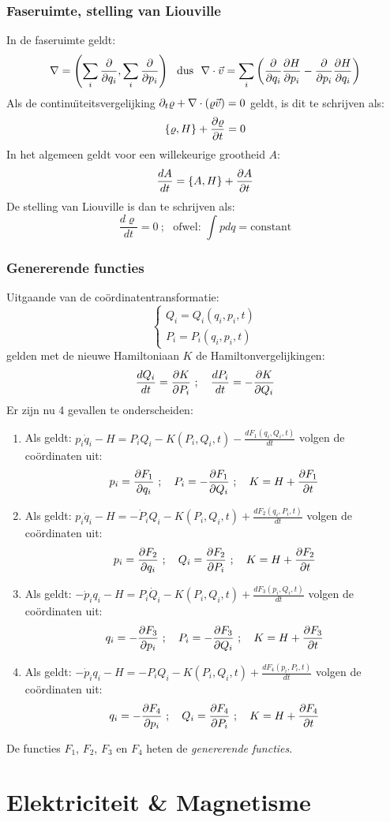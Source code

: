 \documentclass[twoside]{report}
\begin{document}
\subsection{Faseruimte, stelling van Liouville}
In de faseruimte geldt:
\[
\nabla=\left(\sum_i\frac{\partial }{\partial q_i},\sum_i\frac{\partial }{\partial p_i}\right)\mbox{~~dus~~}
\nabla\cdot\vec{v}=\sum_i\left(\frac{\partial }{\partial q_i}\frac{\partial H}{\partial p_i}-\frac{\partial }{\partial p_i}\frac{\partial H}{\partial q_i}\right)
\]
Als de continu\"{\i}teitsvergelijking $\partial_t\varrho+\nabla\cdot(\varrho\vec{v})=0$ geldt,
is dit te schrijven als:
\[
\{\varrho,H\}+\frac{\partial \varrho}{\partial t}=0
\]
In het algemeen geldt voor een willekeurige grootheid $A$:
\[
\frac{dA}{dt}=\{A,H\}+\frac{\partial A}{\partial t}
\]
De stelling van Liouville is dan te schrijven als:
\[
\frac{d\varrho}{dt}=0~;~~~\mbox{ofwel:~}\int pdq=\mbox{constant}
\]
\subsection{Genererende functies}
Uitgaande van de co\"ordinatentransformatie:
\[
\left\{\begin{array}{l}
Q_i=Q_i(q_i,p_i,t)\\
P_i=P_i(q_i,p_i,t)
\end{array}\right.
\]
gelden met de nieuwe Hamiltoniaan $K$ de Hamiltonvergelijkingen:
\[
\frac{dQ_i}{dt}=\frac{\partial K}{\partial P_i}~;~~~\frac{dP_i}{dt}=-\frac{\partial K}{\partial Q_i}
\]
Er zijn nu 4 gevallen te onderscheiden:
\begin{enumerate}
\item Als geldt: $\displaystyle p_i\dot{q}_i-H=P_iQ_i-K(P_i,Q_i,t)-\frac{dF_1(q_i,Q_i,t)}{dt}$
volgen de co\"ordinaten uit:
\[
p_i=\frac{\partial F_1}{\partial q_i}~;~~~P_i=-\frac{\partial F_1}{\partial Q_i}~;~~~K=H+\frac{\partial F_1}{\partial t}
\]
\item Als geldt: $\displaystyle p_i\dot{q}_i-H=-\dot{P}_iQ_i-K(P_i,Q_i,t)+\frac{dF_2(q_i,P_i,t)}{dt}$
volgen de co\"ordinaten uit:
\[
p_i=\frac{\partial F_2}{\partial q_i}~;~~~Q_i=\frac{\partial F_2}{\partial P_i}~;~~~K=H+\frac{\partial F_2}{\partial t}
\]
\item Als geldt: $\displaystyle-\dot{p}_iq_i-H=P_i\dot{Q}_i-K(P_i,Q_i,t)+\frac{dF_3(p_i,Q_i,t)}{dt}$
volgen de co\"ordinaten uit:
\[
q_i=-\frac{\partial F_3}{\partial p_i}~;~~~P_i=-\frac{\partial F_3}{\partial Q_i}~;~~~K=H+\frac{\partial F_3}{\partial t}
\]
\item Als geldt: $\displaystyle-\dot{p}_iq_i-H=-P_iQ_i-K(P_i,Q_i,t)+\frac{dF_4(p_i,P_i,t)}{dt}$
volgen de co\"ordinaten uit:
\[
q_i=-\frac{\partial F_4}{\partial p_i}~;~~~Q_i=\frac{\partial F_4}{\partial P_i}~;~~~K=H+\frac{\partial F_4}{\partial t}
\]
\end{enumerate}
De functies $F_1$, $F_2$, $F_3$ en $F_4$ heten de {\it genererende functies}.

\chapter{Elektriciteit \& Magnetisme}
\end{document}
